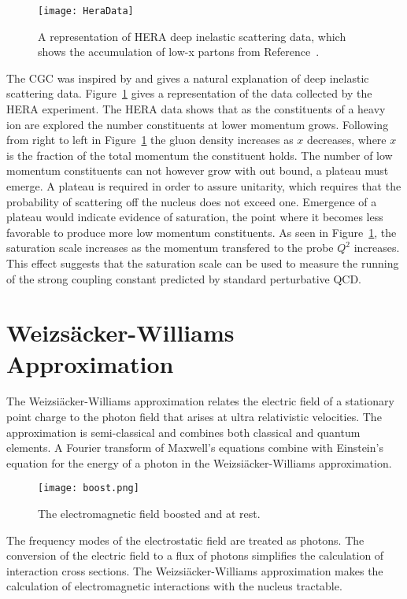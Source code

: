   \begin{figure}[h]
    \centering
      \texttt{[image: HeraData]}
    \caption{A representation of HERA deep inelastic scattering data, which shows
  	the accumulation of low-x partons from Reference~\cite{CGC2Lec}.}
    \label{HeraData}
  \end{figure}
  The CGC was inspired by and gives a natural explanation of deep inelastic
  	scattering data. 
  Figure~\ref{HeraData} gives a representation of the data collected by the HERA 
  	experiment. 
  The HERA data shows that as the constituents of a heavy ion are explored the
  	number constituents at lower momentum grows. 
  Following from right to left in Figure~\ref{HeraData} the gluon density
  	increases as $x$ decreases, where $x$ is the fraction of the total
  	momentum the constituent holds.
  The number of low momentum constituents can not however grow with out bound, a 
  	plateau must emerge.
  A plateau is required in order to assure unitarity, which requires that the
  	probability of scattering off the nucleus does not exceed one. 
  Emergence of a plateau would indicate evidence of saturation, the point where 
  	it becomes less favorable to produce more low momentum constituents. 
  As seen in Figure~\ref{HeraData}, the saturation scale increases as the momentum 
  	transfered to the probe $Q^2$ increases.
  This effect suggests that the saturation scale can be used to measure the 
  	running of the strong coupling constant predicted by standard
  	perturbative QCD.

  \section{Weizs\"{a}cker-Williams Approximation}
    The Weizsi\"{a}cker-Williams approximation relates the electric field of a 
      stationary point charge to the photon field that arises at ultra 
      relativistic velocities. 
    The approximation is semi-classical and combines both classical and quantum 
      elements.
    A Fourier transform of Maxwell's equations combine with Einstein's equation 
      for the energy of a photon in the Weizsi\"{a}cker-Williams approximation.
    \begin{wrapfigure}{r}{0.75\textwidth}
      \begin{center}
        \texttt{[image: boost.png]}
      \end{center}
      \caption{ \label{fig:boost} The electromagnetic field boosted and at rest. }
    \end{wrapfigure}
    The frequency modes of the electrostatic field are treated as photons. 
    The conversion of the electric field to a flux of photons simplifies the
      calculation of interaction cross sections. 
    The Weizsi\"{a}cker-Williams approximation makes the calculation of 
      electromagnetic interactions with the nucleus tractable. 

